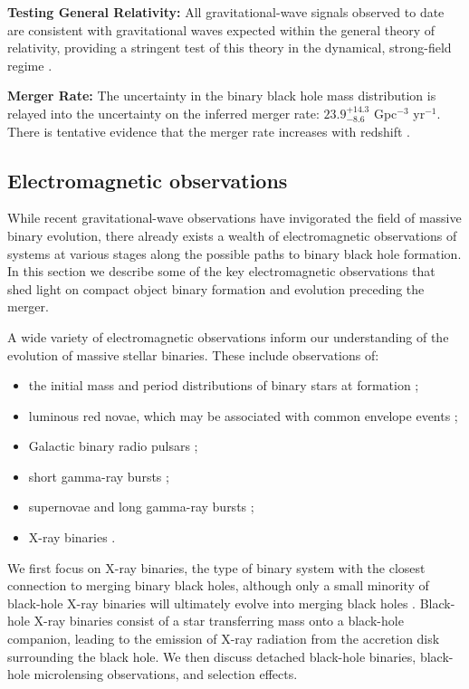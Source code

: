 \documentclass[review]{elsarticle}
\begin{document}
\textbf{Testing General Relativity:} All gravitational-wave signals observed to date are consistent with gravitational waves expected within the general theory of relativity, providing a stringent test of this theory in the dynamical, strong-field regime \citep{GW150914:GR,GWTC2:GR}.

\textbf{Merger Rate:} The uncertainty in the binary black hole mass distribution is relayed into the uncertainty on the inferred merger rate: $23.9^{+14.3}_{-8.6}$ Gpc$^{-3}$ yr$^{-1}$.  There is tentative evidence that the merger rate increases with redshift \citep{GWTC2:pop}.  

\subsection{Electromagnetic observations}

While recent gravitational-wave observations have invigorated the field of massive binary evolution, there already exists a wealth of electromagnetic observations of systems at various stages along the possible paths to binary black hole formation. In this section we describe some of the key electromagnetic observations that shed light on compact object binary formation and evolution preceding the merger.

A wide variety of electromagnetic observations inform our understanding of the evolution of massive stellar binaries. These include observations of: 
\begin{itemize}
\item the initial mass and period distributions of binary stars at formation \citep[e.g.,][]{Sana:2012,MoeDiStefano:2017}; 
\item luminous red novae, which may be associated with common envelope events \citep[e.g.,][]{Ivanova:2013LRN,Howitt:2020};
\item Galactic binary radio pulsars \citep[e.g.,][]{Tauris:2017};
\item short gamma-ray bursts \citep[e.g.,][]{Berger:2014};
\item supernovae and long gamma-ray bursts \citep[e.g.,][]{Cantiello:2007,Szecsi:2017,Bavera:2021};
\item X-ray binaries \citep[e.g.,][]{TaurisvdH:2006}.
\end{itemize}
We first focus on X-ray binaries, the type of binary system with the closest connection to merging binary black holes, although only a small minority of black-hole X-ray binaries will ultimately evolve into merging black holes \citep[e.g.,][]{CygnusX3:2012,Neijssel:2020CygX1}. Black-hole X-ray binaries consist of a star transferring mass onto a black-hole companion, leading to the emission of X-ray radiation from the accretion disk surrounding the black hole.  We then discuss detached black-hole binaries, black-hole microlensing observations, and selection effects.
\end{document}
